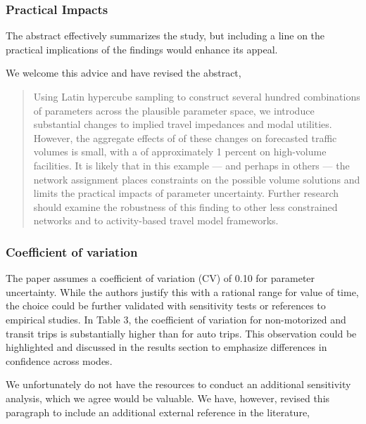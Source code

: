 \documentclass{ar2rc}
\begin{document}
\subsubsection{Practical Impacts}
\RC The abstract effectively summarizes the study, but including a line on the practical
implications of the findings would enhance its appeal.

\AR We welcome this advice and have revised the abstract,

\begin{quote}
     Using Latin hypercube sampling to
construct several hundred combinations of parameters across the
plausible parameter space, we introduce substantial changes to implied
travel impedances and modal utilities\DIFaddbegin {}\DIFaddend .
However, the aggregate effects of of these changes on forecasted traffic volumes
is small, with a \DIFdelbegin {}\DIFdelend \DIFaddbegin {}\DIFaddend of approximately 1 percent on high-volume facilities.
It is likely that in this example --- and perhaps in others --- the \DIFdelbegin {}\DIFdelend network
assignment places constraints on the possible volume solutions and limits the
practical impacts of parameter uncertainty. \DIFaddbegin {}\DIFaddend Further
research should examine the robustness of this finding to other less constrained
networks and to activity-based travel model frameworks.
\end{quote}

\subsubsection{Coefficient of variation}
\RC The paper assumes a coefficient of variation (CV) of 0.10 for parameter uncertainty.
While the authors justify this with a rational range for value of time, the choice could be
further validated with sensitivity tests or references to empirical studies. In Table 3, the
coefficient of variation for non-motorized and transit trips is substantially higher than
for auto trips. This observation could be highlighted and discussed in the results
section to emphasize differences in confidence across modes.

\AR We unfortunately do not have the resources to conduct an additional
sensitivity analysis, which we agree would be valuable. We have, however, revised this paragraph
to include an additional external reference in the literature,
\end{document}
